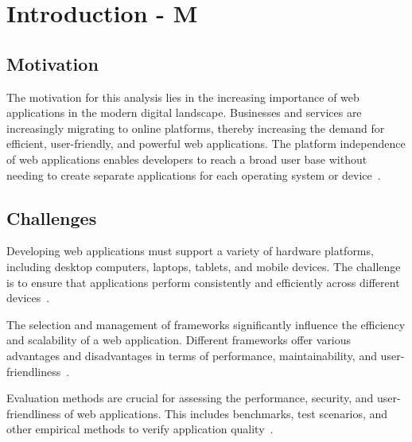 \chapter{Introduction - M}
\label{cha:Introduction}


\section{Motivation}
The motivation for this analysis lies in the increasing importance of web applications in the modern digital landscape. 
Businesses and services are increasingly migrating to online platforms, thereby increasing the demand for efficient, user-friendly, and powerful web applications. 
The platform independence of web applications enables developers to reach a broad user base without needing to create separate applications for each operating system or device~\cite{unctad}.

\section{Challenges}

Developing web applications must support a variety of hardware platforms, including desktop computers, laptops, tablets, and mobile devices. 
The challenge is to ensure that applications perform consistently and efficiently across different devices~\cite{mao2014developing}.

The selection and management of frameworks significantly influence the efficiency and scalability of a web application. 
Different frameworks offer various advantages and disadvantages in terms of performance, maintainability, and user-friendliness~\cite{verma2022comparison}.

Evaluation methods are crucial for assessing the performance, security, and user-friendliness of web applications. 
This includes benchmarks, test scenarios, and other empirical methods to verify application quality~\cite{verma2022comparison}.

